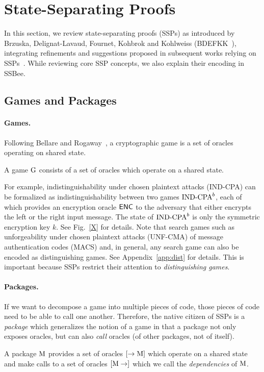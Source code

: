 \section{State-Separating Proofs}
In this section, we review state-separating proofs (SSPs)
as introduced by Brzuska, Delignat-Lavaud, Fournet, Kohbrok and
Kohlweiss (BDEFKK~\cite{X}), integrating refinements and
suggestions proposed in subsequent works relying on SSPs~\cite{blanket-cite,konrads-thesis,sabinesworks}. While reviewing core SSP concepts,
we also explain their encoding in SSBee.

\subsection{Games and Packages}
\paragraph{Games.}
Following Bellare and Rogaway~\cite{Bellare-Rogaway}, a cryptographic game is a set
of oracles operating on shared state.
\begin{definition}
A game $\text{\textrm{\upshape G}}$ consists of a set of oracles
which operate on a shared state.
\end{definition}
For example, indistinguishability under chosen plaintext attacks (IND-CPA)
can be formalized as indistinguishability between two games $\text{\textrm{\upshape IND-CPA}}^b$, 
each of which provides an encryption oracle $\mathsf{ENC}$ to the adversary that
either encrypts the left or the right input message. The state of 
$\text{\textrm{\upshape IND-CPA}}^b$ is only the symmetric encryption key $k$. See Fig.~\ref{X}
for details. Note that search games such as unforgeability under chosen
plaintext attacks (UNF-CMA) of message authentication codes (MACS) and, in general,
any search game can also be encoded as distinguishing games. See Appendix~\ref{app:dist} for details. This is important because SSPs restrict their attention to \emph{distinguishing games}.

\paragraph{Packages.}
If we want to decompose a game into multiple pieces of code, those pieces
of code need to be able to call one another. Therefore, the native citizen
of SSPs is a \emph{package} which generalizes the notion of a game in that
a package not only exposes oracles, but can also \emph{call} oracles (of
other packages, not of itself).

\begin{definition}[Package]
A package $\text{\textrm{\upshape M}}$ provides a set of oracles $[\rightarrow \text{\textrm{\upshape M}}]$
which operate on a shared state and make calls to a set of oracles
$[\text{\textrm{\upshape M}}\rightarrow]$ which we call the \emph{dependencies} of $\text{\textrm{\upshape M}}$.
\end{definition}

